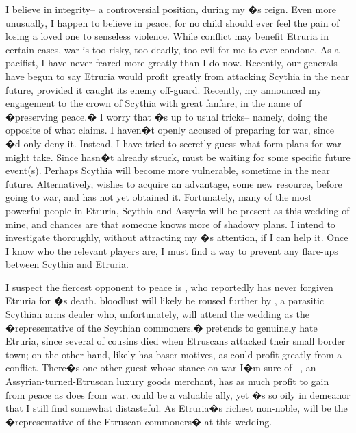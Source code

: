 \documentclass[char]{Kos}
\begin{document}
I believe in integrity-- a controversial position, during my \cEtruriaKing{\parent}�s reign. Even more unusually, I happen to believe in peace, for no child should ever feel the pain of losing a loved one to senseless violence. While conflict may benefit Etruria in certain cases, war is too risky, too deadly, too evil for me to ever condone. As a pacifist, I have never feared more greatly than I do now. Recently, our generals have begun to say Etruria would profit greatly from attacking Scythia in the near future, provided it caught its enemy off-guard. Recently, my \cEtruriaKing{\parent} announced my engagement to the crown \cBride{\prince} of Scythia with great fanfare, in the name of �preserving peace.� I worry that \cEtruriaKing{\Parent}�s up to \cEtruriaKing{\their} usual tricks-- namely, doing the opposite of what \cEtruriaKing{\they} claims. I haven�t openly accused \cEtruriaKing{\them} of preparing for war, since \cEtruriaKing{\they}�d only deny it. Instead, I have tried to secretly guess what form \cEtruriaKing{\their} plans for war might take. Since \cEtruriaKing{\they} hasn�t already struck, \cEtruriaKing{\They} must be waiting for some specific future event(s). Perhaps Scythia will become more vulnerable, sometime in the near future. Alternatively, \cEtruriaKing{\they} wishes to acquire an advantage, some new resource, before going to war, and \cEtruriaKing{\they} has not yet obtained it. Fortunately, many of the most powerful people in Etruria, Scythia and Assyria will be present as this wedding of mine, and chances are that someone knows more of \cEtruriaKing{\their} shadowy plans. I intend to investigate thoroughly, without attracting my \cEtruriaKing{\parent}�s attention, if I can help it. Once I know who the relevant players are, I must find a way to prevent any flare-ups between Scythia and Etruria.

I suspect the fiercest opponent to peace is \cScythiaQueen{\Monarch} \cScythiaQueen{\nickname}, who reportedly has never forgiven Etruria for \cFugitive{\nickname}�s death. \cScythiaQueen{\Their} bloodlust will likely be roused further by \cArmsDealer{\name}, a parasitic Scythian arms dealer who, unfortunately, will attend the wedding as the �representative of the Scythian commoners.� \cArmsDealer{\They} pretends to genuinely hate Etruria, since several of \cArmsDealer{\their} cousins died when Etruscans attacked their small border town; on the other hand, \cArmsDealer{\they} likely has baser motives, as \cArmsDealer{\they} could profit greatly from a conflict. There�s one other guest whose stance on war I�m sure of-- \cMerchant{\name}, an Assyrian-turned-Etruscan luxury goods merchant, has as much profit to gain from peace as \cArmsDealer{\nickname} does from war. \cMerchant{\nickname} could be a valuable ally, yet \cMerchant{\they}�s so oily in \cMerchant{\their} demeanor that I still find \cMerchant{\them} somewhat distasteful. As Etruria�s richest non-noble, \cMerchant{\nickname} will be the �representative of the Etruscan commoners� at this wedding.
\end{document}
